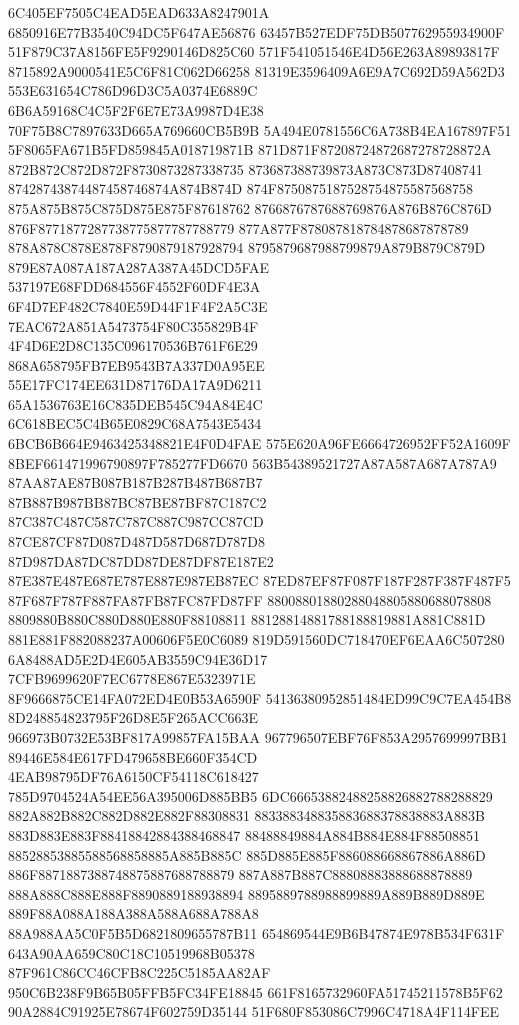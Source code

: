6C405EF7505C4EAD5EAD633A8247901A
6850916E77B3540C94DC5F647AE56876
63457B527EDF75DB507762955934900F
51F879C37A8156FE5F9290146D825C60
571F541051546E4D56E263A89893817F
8715892A9000541E5C6F81C062D66258
81319E3596409A6E9A7C692D59A562D3
553E631654C786D96D3C5A0374E6889C
6B6A59168C4C5F2F6E7E73A9987D4E38
70F75B8C7897633D665A769660CB5B9B
5A494E0781556C6A738B4EA167897F51
5F8065FA671B5FD859845A018719871B
871D871F87208724872687278728872A
872B872C872D872F8730873287338735
873687388739873A873C873D87408741
87428743874487458746874A874B874D
874F8750875187528754875587568758
875A875B875C875D875E875F87618762
8766876787688769876A876B876C876D
876F8771877287738775877787788779
877A877F878087818784878687878789
878A878C878E878F8790879187928794
8795879687988799879A879B879C879D
879E87A087A187A287A387A45DCD5FAE
537197E68FDD684556F4552F60DF4E3A
6F4D7EF482C7840E59D44F1F4F2A5C3E
7EAC672A851A5473754F80C355829B4F
4F4D6E2D8C135C096170536B761F6E29
868A658795FB7EB9543B7A337D0A95EE
55E17FC174EE631D87176DA17A9D6211
65A1536763E16C835DEB545C94A84E4C
6C618BEC5C4B65E0829C68A7543E5434
6BCB6B664E9463425348821E4F0D4FAE
575E620A96FE6664726952FF52A1609F
8BEF661471996790897F785277FD6670
563B54389521727A87A587A687A787A9
87AA87AE87B087B187B287B487B687B7
87B887B987BB87BC87BE87BF87C187C2
87C387C487C587C787C887C987CC87CD
87CE87CF87D087D487D587D687D787D8
87D987DA87DC87DD87DE87DF87E187E2
87E387E487E687E787E887E987EB87EC
87ED87EF87F087F187F287F387F487F5
87F687F787F887FA87FB87FC87FD87FF
88008801880288048805880688078808
8809880B880C880D880E880F88108811
88128814881788188819881A881C881D
881E881F882088237A00606F5E0C6089
819D591560DC718470EF6EAA6C507280
6A8488AD5E2D4E605AB3559C94E36D17
7CFB9699620F7EC6778E867E5323971E
8F9666875CE14FA072ED4E0B53A6590F
54136380952851484ED99C9C7EA454B8
8D248854823795F26D8E5F265ACC663E
966973B0732E53BF817A99857FA15BAA
967796507EBF76F853A2957699997BB1
89446E584E617FD479658BE660F354CD
4EAB98795DF76A6150CF54118C618427
785D9704524A54EE56A395006D885BB5
6DC66653882488258826882788288829
882A882B882C882D882E882F88308831
883388348835883688378838883A883B
883D883E883F88418842884388468847
88488849884A884B884E884F88508851
88528853885588568858885A885B885C
885D885E885F886088668867886A886D
886F8871887388748875887688788879
887A887B887C88808883888688878889
888A888C888E888F8890889188938894
8895889788988899889A889B889D889E
889F88A088A188A388A588A688A788A8
88A988AA5C0F5B5D6821809655787B11
654869544E9B6B47874E978B534F631F
643A90AA659C80C18C10519968B05378
87F961C86CC46CFB8C225C5185AA82AF
950C6B238F9B65B05FFB5FC34FE18845
661F8165732960FA51745211578B5F62
90A2884C91925E78674F602759D35144
51F680F853086C7996C4718A4F114FEE
